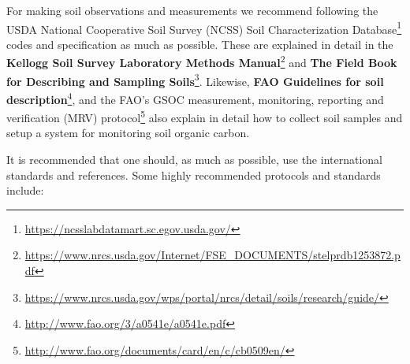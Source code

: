 \documentclass[
  graybox,natbib,nospthms]{svmono}
\renewcommand{\href}[2]{#2 (\url{#1})}
\renewcommand{\href}[2]{#2\footnote{\url{#1}}}
\begin{document}
For making soil observations and measurements we recommend following the USDA \href{https://ncsslabdatamart.sc.egov.usda.gov/}{National Cooperative Soil Survey (NCSS) Soil
Characterization Database} codes and specification as much as possible. These are explained in detail in the \href{https://www.nrcs.usda.gov/Internet/FSE_DOCUMENTS/stelprdb1253872.pdf}{\textbf{Kellogg Soil Survey Laboratory Methods Manual}}
and \href{https://www.nrcs.usda.gov/wps/portal/nrcs/detail/soils/research/guide/}{\textbf{The Field Book for Describing and Sampling Soils}}.
Likewise, \href{http://www.fao.org/3/a0541e/a0541e.pdf}{\textbf{FAO Guidelines for soil description}},
and the FAO's \href{http://www.fao.org/documents/card/en/c/cb0509en/}{GSOC measurement, monitoring, reporting and verification (MRV) protocol} also explain in
detail how to collect soil samples and setup a system for monitoring soil organic carbon.

It is recommended that one should, as much as possible, use the international standards
and references. Some highly recommended protocols and standards include:
\end{document}
